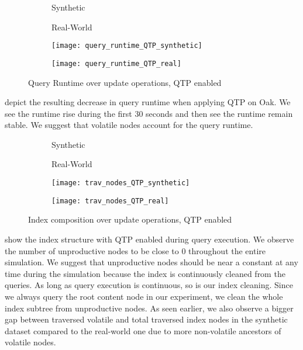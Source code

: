 \documentclass[abstracton,12pt]{scrartcl}
\theoremstyle{definition}
\begin{document}
\begin{figure}[h]
  \centering
  \begin{subfigure}{0.49\linewidth}
    \centering Synthetic
  \end{subfigure}
  \begin{subfigure}{0.49\linewidth}
    \centering Real-World
  \end{subfigure}
  \begin{subfigure}{0.49\linewidth}
    \texttt{[image: query\_runtime\_QTP\_synthetic]}
    \caption{}
    \label{fig:query_runtime_QTP_synthetic}
  \end{subfigure}
  \begin{subfigure}{0.49\linewidth}
    \texttt{[image: query\_runtime\_QTP\_real]}
    \caption{}
    \label{fig:query_runtime_QTP_real}
  \end{subfigure}
  \caption{Query Runtime over update operations, QTP enabled}
\end{figure}

 depict the
resulting decrease in query runtime when applying QTP on Oak. We see the runtime
rise during the first 30 seconds and then see the runtime remain stable.
We suggest that volatile nodes account for the query runtime. 

\begin{figure}[h]
  \centering
  \begin{subfigure}{0.49\linewidth}
    \centering Synthetic
  \end{subfigure}
  \begin{subfigure}{0.49\linewidth}
    \centering Real-World
  \end{subfigure}
  \begin{subfigure}{0.49\linewidth}
    \texttt{[image: trav\_nodes\_QTP\_synthetic]}
    \caption{}
    \label{fig:trav_nodes_QTP_synthetic}
  \end{subfigure}
  \begin{subfigure}{0.49\linewidth}
    \texttt{[image: trav\_nodes\_QTP\_real]}
    \caption{}
    \label{fig:trav_nodes_QTP_real}
  \end{subfigure}
  \caption{Index composition over update operations, QTP enabled}
\end{figure}

 show the index
structure with QTP enabled during query execution. We observe the number of
unproductive nodes to be close to 0 throughout the entire simulation. We suggest
that unproductive nodes should be near a constant at any time during the simulation
because the index is continuously cleaned from the queries. As long as query execution is
continuous, so is our index cleaning. Since we always query the root content
node in our experiment, we clean the whole index subtree from unproductive nodes.
As seen earlier, we also observe a bigger gap between traversed volatile and total
traversed index nodes in the synthetic dataset compared to the real-world one due to
more non-volatile ancestors of volatile nodes.
\end{document}
